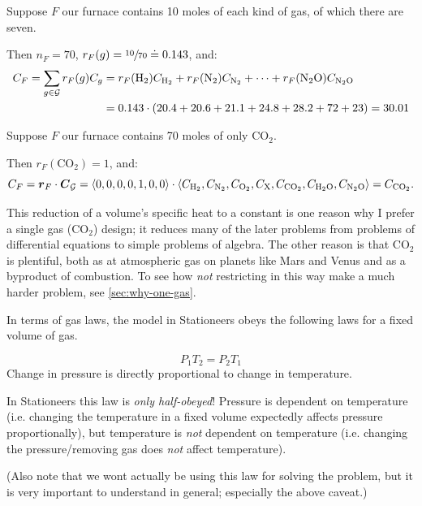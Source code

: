 \documentclass{article}
\newcommand{\Hyd}{\mathrm{H}_2}
\newcommand{\Nit}{\mathrm{N}_2}
\newcommand{\Ox}{\mathrm{O}_2}
\newcommand{\Pol}{\mathrm{X}}
\newcommand{\CDiox}{\mathrm{CO}_2}
\newcommand{\Water}{\mathrm{H}_2\mathrm{O}}
\newcommand{\NiOx}{\mathrm{N}_2\mathrm{O}}
\begin{document}
\begin{example*}
    Suppose $F$ our furnace contains 10 moles of each kind of gas, of which there are seven.

    Then $n_F=70$, $r_F(g)=\sfrac{10}{70} \doteq 0.143$, and:
    \begin{align*}
        C_F
        = \sum_{g\in\calG}r_F(g)C_g
        &= r_F(\Hyd)C_{\Hyd}+r_F(\Nit)C_{\Nit}+\cdots+r_F(\NiOx)C_{\NiOx} \\
        &= 0.143\cdot(20.4 + 20.6 + 21.1 + 24.8 + 28.2 + 72 + 23)
        = 30.01
    \end{align*}
\end{example*}
\begin{example*}
    Suppose $F$ our furnace contains 70 moles of only $\CDiox$.

    Then $r_F(\CDiox)=1$, and:
    \[
        C_F
        = \vec{r}_F \cdot \vec{C}_{\calG}
        = \angvec{0,0,0,0,1,0,0}
        \cdot
        \angvec{C_{\Hyd},C_{\Nit},C_{\Ox},C_{\Pol},C_{\CDiox},C_{\Water},C_{\NiOx}}
        = C_{\CDiox}.
    \]
\end{example*}
This reduction of a volume's specific heat to a constant is one reason why I prefer a single gas
($\CDiox$) design; it reduces many of the later problems from problems of differential equations to
simple problems of algebra. The other reason is that $\CDiox$ is plentiful, both as at atmospheric
gas on planets like Mars and Venus and as a byproduct of combustion. To see how \emph{not}
restricting in this way make a much harder problem, see \cref{sec:why-one-gas}.

In terms of gas laws, the model in Stationeers obeys the following laws for a fixed volume of gas.

\begin{definition}
    \begin{equation}
        P_1 T_2=P_2 T_1
        \label{eq:gay-lussac}
    \end{equation}
    Change in pressure is directly proportional to change in temperature.
    \begin{note*}
        In Stationeers this law is \emph{only half-obeyed}!
        Pressure is dependent on temperature (i.e. changing the temperature in a fixed volume
        expectedly affects pressure proportionally), but temperature is \emph{not} dependent on
        temperature (i.e. changing the pressure/removing gas does \emph{not} affect temperature).

        (Also note that we wont actually be using this law for solving the problem, but it is very
        important to understand in general; especially the above caveat.)
    \end{note*}
\end{definition}
\end{document}
